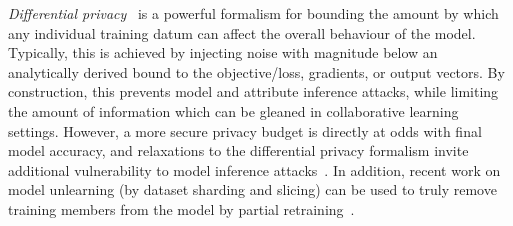 \emph{Differential privacy}~\parencite{DBLP:conf/ccs/AbadiCGMMT016} is a powerful formalism for bounding the amount by which any individual training datum can affect the overall behaviour of the model.
Typically, this is achieved by injecting noise with magnitude below an analytically derived bound to the objective/loss, gradients, or output vectors.
By construction, this prevents model and attribute inference attacks, while limiting the amount of information which can be gleaned in collaborative learning settings.
However, a more secure privacy budget is directly at odds with final model accuracy, and relaxations to the differential privacy formalism invite additional vulnerability to model inference attacks~\parencite{DBLP:conf/uss/Jayaraman019}.
In addition, recent work on model unlearning (by dataset sharding and slicing) can be used to truly remove training members from the model by partial retraining~\parencite{DBLP:conf/sp/BourtouleCCJTZL21}.
